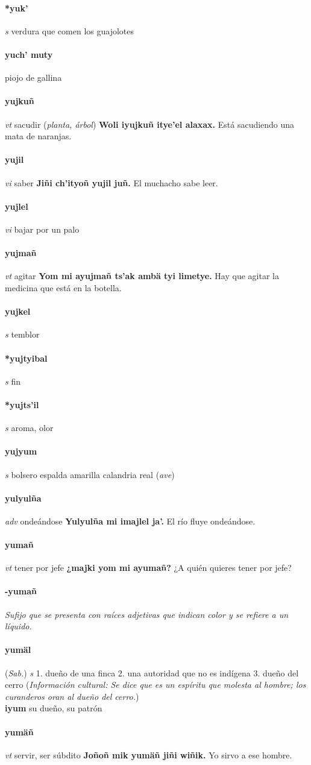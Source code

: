 \documentclass{scrbook}
\newcommand{\entry}[1]{\paragraph{#1}}
\newcommand{\onedefinition}[1]{#1.}
\newcommand{\nontranslationdef}[1]{\textit{#1}}
\newcommand{\partofspeech}[1]{\textit{#1}}
\newcommand{\spanishtranslation}[1]{#1}
\newcommand{\clarification}[1]{(\textit{#1})}
\newcommand{\cholexample}[1]{\textbf{#1}}
\newcommand{\exampletranslation}[1]{#1}
\newcommand{\relevantdialect}[1]{(\textit{#1})}
\newcommand{\culturalinformation}[1]{(\textit{#1})}
\newcommand{\secondaryentry}[1]{\\\textbf{#1}}
\newcommand{\secondtranslation}[1]{#1}
\begin{document}
\begin{multicols}{2}
\entry{*yuk'}
\partofspeech{s}
\spanishtranslation{verdura que comen los guajolotes}

\entry{yuch' muty}
\spanishtranslation{piojo de gallina}

\entry{yujkuñ}
\partofspeech{vt}
\spanishtranslation{sacudir}
\clarification{planta, árbol}
\cholexample{Woli iyujkuñ itye'el alaxax.}
\exampletranslation{Está sacudiendo una mata de naranjas.}

\entry{yujil}
\partofspeech{vi}
\spanishtranslation{saber}
\cholexample{Jiñi ch'ityoñ yujil juñ.}
\exampletranslation{El muchacho sabe leer.}

\entry{yujlel}
\partofspeech{vi}
\spanishtranslation{bajar por un palo}

\entry{yujmañ}
\partofspeech{vt}
\spanishtranslation{agitar}
\cholexample{Yom mi ayujmañ ts'ak ambä tyi limetye.}
\exampletranslation{Hay que agitar la medicina que está en la botella.}

\entry{yujkel}
\partofspeech{s}
\spanishtranslation{temblor}

\entry{*yujtyibal}
\partofspeech{s}
\spanishtranslation{fin}

\entry{*yujts'il}
\partofspeech{s}
\spanishtranslation{aroma, olor}

\entry{yujyum}
\partofspeech{s}
\spanishtranslation{bolsero espalda amarilla}
\spanishtranslation{calandria real}
\clarification{ave}

\entry{yulyulña}
\partofspeech{adv}
\spanishtranslation{ondeándose}
\cholexample{Yulyulña mi imajlel ja'.}
\exampletranslation{El río fluye ondeándose.}

\entry{yumañ}
\partofspeech{vt}
\spanishtranslation{tener por jefe}
\cholexample{¿majki yom mi ayumañ?}
\exampletranslation{¿A quién quieres tener por jefe?}

\entry{-yumañ}
\nontranslationdef{Sufijo que se presenta con raíces adjetivas que indican color y se refiere a un líquido.}

\entry{yumäl}
\relevantdialect{Sab.}
\partofspeech{s}
\onedefinition{1}
\spanishtranslation{dueño de una finca}
\onedefinition{2}
\spanishtranslation{una autoridad que no es indígena}
\onedefinition{3}
\spanishtranslation{dueño del cerro}
\culturalinformation{Información cultural: Se dice que es un espíritu que molesta al hombre; los curanderos oran al dueño del cerro.}
\secondaryentry{iyum}
\secondtranslation{su dueño, su patrón}

\entry{yumäñ}
\partofspeech{vt}
\spanishtranslation{servir, ser súbdito}
\cholexample{Joñoñ mik yumäñ jiñi wiñik.}
\exampletranslation{Yo sirvo a ese hombre.}


\end{multicols}
\end{document}
